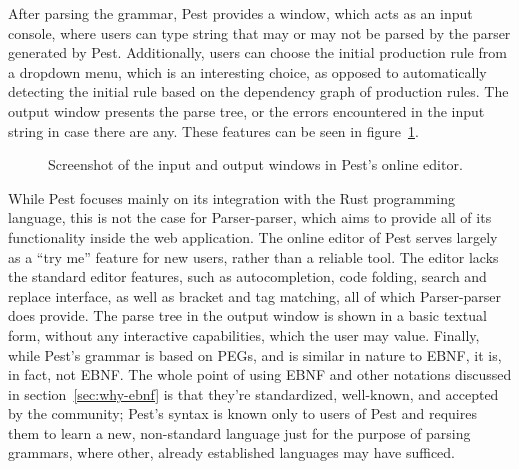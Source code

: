 \documentclass[english,engineering]{wizthesis}
\newcommand{\thisproject}{Parser-parser}
\begin{document}
After parsing the grammar, Pest provides a window, which acts as an input
console, where users can type string that may or may not be parsed by the parser
generated by Pest. Additionally, users can choose the initial production rule
from a dropdown menu, which is an interesting choice, as opposed to
automatically detecting the initial rule based on the dependency graph of
production rules. The output window presents the parse tree, or the errors
encountered in the input string in case there are any. These features can be
seen in figure~\ref{fig:pest-output}.

\begin{figure}[ht]
  \centering
  \caption{Screenshot of the input and output windows in Pest's online editor.}
  \label{fig:pest-output}
\end{figure}

While Pest focuses mainly on its integration with the Rust programming language,
this is not the case for \thisproject{}, which aims to provide all of its
functionality inside the web application. The online editor of Pest serves
largely as a ``try me'' feature for new users, rather than a reliable tool. The
editor lacks the standard editor features, such as autocompletion, code folding,
search and replace interface, as well as bracket and tag matching, all of which
\thisproject{} does provide. The parse tree in the output window is shown in a
basic textual form, without any interactive capabilities, which the user may
value. Finally, while Pest's grammar is based on PEGs, and is similar in nature
to EBNF, it is, in fact, not EBNF. The whole point of using EBNF and other
notations discussed in section~\ref{sec:why-ebnf} is that they're standardized,
well-known, and accepted by the community; Pest's syntax is known only to users
of Pest and requires them to learn a new, non-standard language just for the
purpose of parsing grammars, where other, already established languages may have
sufficed.
\end{document}
